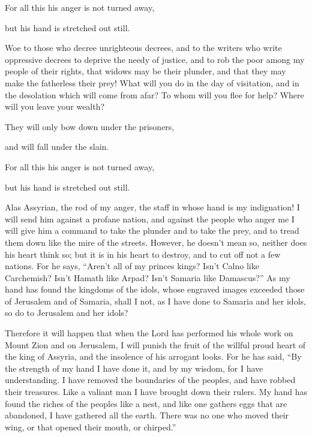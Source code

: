 For all this his anger is not turned away,

but his hand is stretched out still.


\mychapter{} \myverse*{}Woe to those who decree unrighteous decrees, and to the writers
who write oppressive decrees
\myverse{}to deprive the needy of justice, and to rob the poor among my people of their
rights, that widows may be their plunder, and that they may make the fatherless their prey!
\myverse{}What will you do in the day of visitation, and in the desolation which will
come from afar? To whom will you flee for help? Where will you leave your wealth?

\myverse{}They will only bow down under the prisoners,

and will fall under the slain.

For all this his anger is not turned away,

but his hand is stretched out still.


\vspace{\baselineskip} \myverse{}Alas Assyrian, the rod of my anger, the staff in whose hand is
my indignation!
\myverse{}I will send him against a profane nation, and against the people who anger
me I will give him a command to take the plunder and to take the prey, and to tread them down like the
mire of the streets.
\myverse{}However, he doesn’t mean so, neither does his heart think so; but it is in
his heart to destroy, and to cut off not a few nations.
\myverse{}For he says, “Aren’t all of my princes kings?
\myverse{}Isn’t Calno like Carchemish? Isn’t Hamath like Arpad? Isn’t Samaria like Damascus?”
\myverse{}As my hand has found the kingdoms of the idols, whose engraved images exceeded
those of Jerusalem and of Samaria,
\myverse{}shall I not, as I have done to Samaria and her idols, so do to Jerusalem
and her idols?

\myverse{}Therefore it will happen that when the Lord has performed his
whole work on Mount Zion and on Jerusalem, I will punish the fruit of the willful proud heart of the king
of Assyria, and the insolence of his arrogant looks.
\myverse{}For he has said, “By the strength of my hand I have done it, and by my wisdom,
for I have understanding. I have removed the boundaries of the peoples, and have robbed their treasures.
Like a valiant man I have brought down their rulers.
\myverse{}My hand has found the riches of the peoples like a nest, and like one gathers
eggs that are abandoned, I have gathered all the earth. There was no one who moved their wing, or that
opened their mouth, or chirped.”

